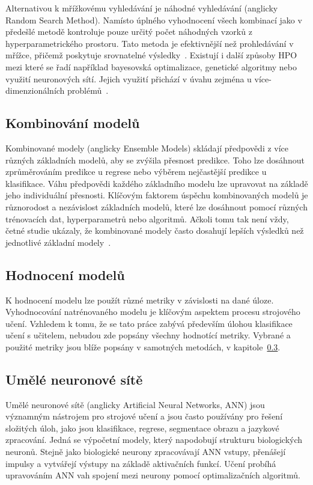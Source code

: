 Alternativou k mřížkovému vyhledávání je náhodné vyhledávání (anglicky Random
Search Method). Namísto úplného vyhodnocení všech kombinací jako v předešlé
metodě kontroluje pouze určitý počet náhodných vzorků z hyperparametrického
prostoru. Tato metoda je efektivnější než prohledávání v mřížce, přičemž
poskytuje srovnatelné
výsledky~\cite{anggoro2021,bergstra2012,Liashchynskyi2019}. Existují i další
způsoby HPO mezi které se řadí například bayesovská optimalizace, genetické
algoritmy nebo využití neuronových sítí. Jejich využití přichází v úvahu zejména
u více-dimenzionálních problémů~\cite{Alibrahim2021,Liashchynskyi2019}.

\subsection{Kombinování modelů}
Kombinované modely (anglicky Ensemble Models) skládají předpovědi z více různých
základních modelů, aby se zvýšila přesnost predikce. Toho lze dosáhnout
zprůměrováním predikce u regrese nebo výběrem nejčastější predikce u
klasifikace. Váhu předpovědi každého základního modelu lze upravovat na základě
jeho individuální přesnosti. Klíčovým faktorem úspěchu kombinovaných modelů je
různorodost a nezávislost základních modelů, které lze dosáhnout pomocí různých
trénovacích dat, hyperparametrů nebo algoritmů. Ačkoli tomu tak není vždy, četné
studie ukázaly, že kombinované modely často dosahují lepších výsledků než
jednotlivé základní modely~\cite{Parker2013}.

\subsection{Hodnocení modelů}
K hodnocení modelu lze použít různé metriky v závislosti na dané úloze.
Vyhodnocování natrénovaného modelu je klíčovým aspektem procesu strojového
učení. Vzhledem k tomu, že se tato práce zabývá především úlohou klasifikace
učení s učitelem, nebudou zde popsány všechny hodnotící metriky. Vybrané a
použité metriky jsou blíže popsány v samotných metodách, v kapitole~\ref{}.

\subsection{Umělé neuronové sítě}
Umělé neuronové sítě (anglicky Artificial Neural Networks, \gls{ANN}) jsou
významným nástrojem pro strojové učení a jsou často používány pro řešení
složitých úloh, jako jsou klasifikace, regrese, segmentace obrazu a jazykové
zpracování. Jedná se výpočetní modely, který napodobují strukturu biologických
neuronů. Stejně jako biologické neurony zpracovávají \gls{ANN} vstupy, přenášejí
impulsy a vytvářejí výstupy na základě aktivačních funkcí. Učení probíhá
upravováním ANN vah spojení mezi neurony pomocí optimalizačních algoritmů.

